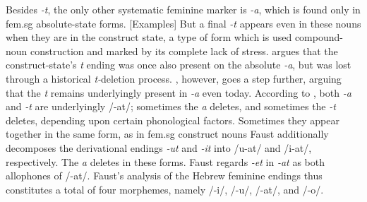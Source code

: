 Besides \textit{-t}, the only other systematic feminine marker is 
\textit{-a}, which is found only 
in fem.sg absolute-state forms. [Examples]
But a final \textit{-t} appears even in these nouns when they are 
in the construct state, a type of form which is used compound-noun construction
and marked by its complete lack of stress.
\cite{schwarzwald:1982} argues that
the construct-state's \textit{t} ending was once also 
present on the absolute \textit{-a}, but was lost through a historical \textit{t-}deletion process.
\cite{faust:2013}, however, goes a step further, arguing that 
the \textit{t} remains underlyingly present in \textit{-a} 
even today. According to \cite{faust:2013}, both
\textit{-a} and \textit{-t} are underlyingly /-at/; sometimes 
the \textit{a} deletes, and sometimes the \textit{-t} deletes, depending 
upon certain phonological factors. Sometimes they appear 
together in the same form, as in fem.sg construct nouns
Faust additionally decomposes the derivational endings 
\textit{-ut} and \textit{-it} into /u-at/ and /i-at/, respectively. The \textit{a} 
deletes in these forms.
Faust regards \textit{-et} in \textit{-at} as both allophones of /-at/. 
Faust's analysis of the Hebrew feminine endings thus constitutes a total of 
four morphemes, namely /-i/, /-u/, /-at/, and /-o/.


%
 

